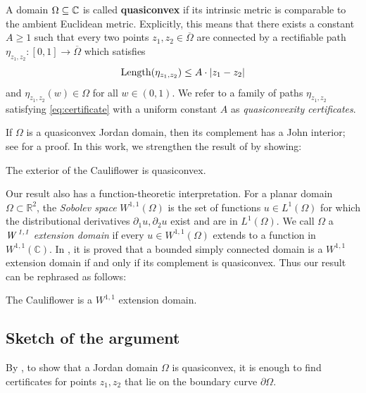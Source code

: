 A domain $\Omega\subseteq\mathbb{C}$ is called \textbf{quasiconvex} 
if its intrinsic metric is comparable to the ambient Euclidean metric. 
Explicitly, this means that there exists a constant $A\geq1$ such that every two points $z_{1},z_{2}\in \overline \Omega$
 are connected by a rectifiable path $\eta_{z_1,z_2}: [0,1]\to \overline \Omega$ which satisfies
\begin{equation}
\operatorname{Length}(\eta_{z_1,z_2})\leq A\cdot |z_{1}-z_{2} |	
\label{eq:certificate}\end{equation}
and  $\eta_{z_1,z_2}(w) \in \Omega$ for all $w \in (0,1)$.
We refer to a family of paths $\eta_{z_1,z_2}$ satisfying \cref{eq:certificate} with a uniform constant $A$ as \emph{quasiconvexity certificates}.

If $\Omega$ is a quasiconvex Jordan domain, then its complement has a John interior; see \cite[Corollary 3.4]{hakobyan_euclidean_2008} for a proof.
In this work, we strengthen the result of \cite[Theorem 6.1]{carleson_julia_1994} by showing:

\begin{theorem}
The exterior of the Cauliflower is quasiconvex.
\end{theorem}




Our result also has a function-theoretic interpretation. 
For a planar domain $\Omega \subset \mathbb R ^2$,
the \emph{Sobolev space} $W^{1,1}(\Omega)$ 
 is the set of functions $u \in L^1(\Omega)$ for which 
 the distributional derivatives $\partial_1 u, \partial_2 u$ exist and are in $L^1(\Omega)$.
We call $\Omega$ a 
\emph{$\textit{W}^\textit{\;1,1}$ extension domain}
 if every 
$u \in W^{1,1}(\Omega)$ extends to a function
in $W^{1,1}(\mathbb{C})$.
In \cite[Equation (1.1) and Theorem 1.4]{strong_bv_extension_2022}, 
it is proved that a bounded simply connected domain
is a $W^{1,1}$ extension domain if and only if its complement is quasiconvex.
Thus our result can be rephrased as follows:


 \begin{theorem}
 The Cauliflower is a $W^{1,1}$ extension domain.
 \end{theorem}
 
\subsection{Sketch of the argument}
By \cite[Corollary F]{hakobyan_euclidean_2008}, to show that a Jordan domain $\Omega$ is quasiconvex, it is enough to find certificates for points $z_{1},z_{2}$ that lie
on the boundary curve $\partial\Omega$.

